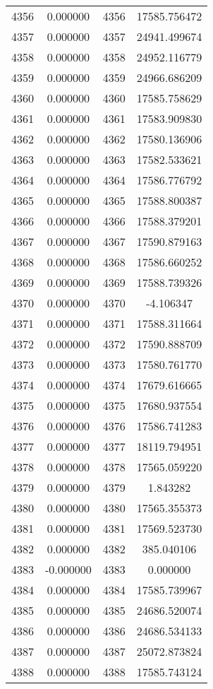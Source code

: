 \documentclass[12pt]{article}
\begin{document}
\begin{longtable}{@{}cccc@{}}
4356 & 0.000000 & 4356 & 17585.756472 \\
4357 & 0.000000 & 4357 & 24941.499674 \\
4358 & 0.000000 & 4358 & 24952.116779 \\
4359 & 0.000000 & 4359 & 24966.686209 \\
4360 & 0.000000 & 4360 & 17585.758629 \\
4361 & 0.000000 & 4361 & 17583.909830 \\
4362 & 0.000000 & 4362 & 17580.136906 \\
4363 & 0.000000 & 4363 & 17582.533621 \\
4364 & 0.000000 & 4364 & 17586.776792 \\
4365 & 0.000000 & 4365 & 17588.800387 \\
4366 & 0.000000 & 4366 & 17588.379201 \\
4367 & 0.000000 & 4367 & 17590.879163 \\
4368 & 0.000000 & 4368 & 17586.660252 \\
4369 & 0.000000 & 4369 & 17588.739326 \\
4370 & 0.000000 & 4370 & -4.106347 \\
4371 & 0.000000 & 4371 & 17588.311664 \\
4372 & 0.000000 & 4372 & 17590.888709 \\
4373 & 0.000000 & 4373 & 17580.761770 \\
4374 & 0.000000 & 4374 & 17679.616665 \\
4375 & 0.000000 & 4375 & 17680.937554 \\
4376 & 0.000000 & 4376 & 17586.741283 \\
4377 & 0.000000 & 4377 & 18119.794951 \\
4378 & 0.000000 & 4378 & 17565.059220 \\
4379 & 0.000000 & 4379 & 1.843282 \\
4380 & 0.000000 & 4380 & 17565.355373 \\
4381 & 0.000000 & 4381 & 17569.523730 \\
4382 & 0.000000 & 4382 & 385.040106 \\
4383 & -0.000000 & 4383 & 0.000000 \\
4384 & 0.000000 & 4384 & 17585.739967 \\
4385 & 0.000000 & 4385 & 24686.520074 \\
4386 & 0.000000 & 4386 & 24686.534133 \\
4387 & 0.000000 & 4387 & 25072.873824 \\
4388 & 0.000000 & 4388 & 17585.743124 \\

\end{longtable}
\end{document}
